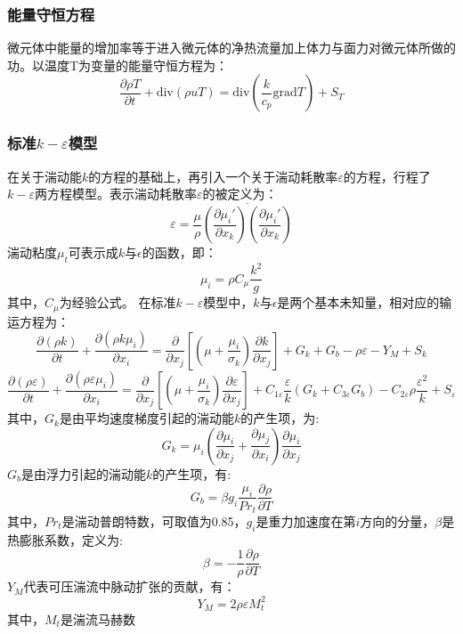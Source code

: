 \subsubsection{能量守恒方程}
微元体中能量的增加率等于进入微元体的净热流量加上体力与面力对微元体所做的功。以温度T为变量的能量守恒方程为：
\begin{equation}
\frac{\partial\rho T}{\partial t}+\text{div}(\rho u T)=\text{div}(\frac{k}{c_p} \text{grad} T)+S_T
\end{equation}
\subsubsection{标准$k-\varepsilon$模型}
在关于湍动能$k$的方程的基础上，再引入一个关于湍动耗散率$\varepsilon$的方程，行程了$k-\varepsilon$两方程模型。表示湍动耗散率$\varepsilon$的被定义为：
\begin{equation}
\varepsilon =\frac{\mu}{\rho} \overline{(\frac{\partial\mu_i'}{\partial x_k}) (\frac{\partial\mu_i'}{\partial x_k})}\label{eq:haosnalv}
\end{equation}
湍动粘度$\mu_t$可表示成$k$与$\epsilon$的函数，即：
\begin{equation}
\mu_i =\rho C_\mu \dfrac{k^2}{g}\label{eq:ke}
\end{equation}
其中，$C_\mu $为经验公式。
在标准$k-\varepsilon$模型中，$k$与$\epsilon$是两个基本未知量，相对应的输运方程为：
\begin{equation}
\dfrac{\partial (\rho k)}{\partial t}+\dfrac{\partial (\rho k\mu_i)}{\partial x_i}=\dfrac{\partial}{\partial x_j}\left[(\mu+\dfrac{\mu_i}{\sigma_k}) \dfrac{\partial k}{\partial x_j}\right]+G_k +G_b -\rho\varepsilon-Y_M +S_k
\end{equation}
\begin{equation}
\dfrac{\partial (\rho \varepsilon)}{\partial t}+\dfrac{\partial (\rho \varepsilon \mu_i)}{\partial x_i}=\dfrac{\partial}{\partial x_j}\left[(\mu+\dfrac{\mu_i}{\sigma_k}) \dfrac{\partial \varepsilon}{\partial x_j}\right]+C_{1\varepsilon}\frac{\varepsilon}{k}(G_k +C_{3\varepsilon}G_b)-C_{2\varepsilon}\rho\frac{\varepsilon^2}{k}+S_\varepsilon
\end{equation}
其中，$G_k$是由平均速度梯度引起的湍动能$k$的产生项，为:
\begin{equation}
G_k =\mu_i\left(\frac{\partial \mu_i}{\partial x_j} +\frac{\partial \mu_j}{\partial x_i} \right)\frac{\partial \mu_i}{\partial x_j}
\end{equation}
$G_b$是由浮力引起的湍动能$k$的产生项，有:
\begin{equation}
G_b = \beta g_i \frac{\mu_i}{P r_t}\frac{\partial \rho}{\partial T}
\end{equation}
其中，$Pr_t$是湍动普朗特数，可取值为0.85，$g_i$是重力加速度在第$i$方向的分量，$\beta$是热膨胀系数，定义为:
\begin{equation}
\beta =-\frac{1}{\rho}\frac{\partial \rho}{\partial T}
\end{equation}
$Y_M$代表可压湍流中脉动扩张的贡献，有：
\begin{equation}
Y_M =2 \rho \varepsilon M_t^2
\end{equation}
其中，$M_t$是湍流马赫数

